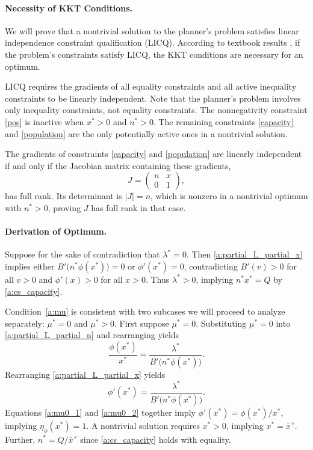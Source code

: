 \documentclass[12pt]{article}
\newcommand{\efficacy}{\phi}
\newcommand{\benefit}{B}
\newcommand{\xunitbar}{\bar{x}^{\,e}}
\newcommand{\elasticity}[1]{\eta_{#1}}
\begin{document}
\paragraph{Necessity of KKT Conditions.}

We will prove that a nontrivial solution to the planner's problem
satisfies linear independence constraint qualification (LICQ).
According to textbook results \citep[see, e.g.,][]{Solodov2011}, if
the problem's constraints satisfy LICQ, the KKT conditions are
necessary for an optimum.

LICQ requires the gradients of all equality constraints and all active
inequality constraints to be linearly independent. Note that the
planner's problem involves only inequality constraints, not equality
constraints. The nonnegativity constraint \eqref{pos} is inactive when
$x^* > 0$ and $n^* > 0$. The remaining constraints \eqref{capacity}
and \eqref{population} are the only potentially active ones in a
nontrivial solution.

The gradients of constraints \eqref{capacity} and \eqref{population}
are linearly independent if and only if the Jacobian matrix containing
these gradients,
\begin{equation}
\label{a:Jacobian}
J = \begin{pmatrix}
n & x \\
0 & 1
\end{pmatrix},
\end{equation}
has full rank. Its determinant is $|J| = n$, which is nonzero in a
nontrivial optimum with $n^* > 0$, proving $J$ has full rank in that
case.

\paragraph{Derivation of Optimum.}

Suppose for the sake of contradiction that $\lambda^* = 0$. Then
\eqref{a:partial_L_partial_x} implies either $\benefit' \! \bigl( n^*
\efficacy(x^*) \bigr) = 0$ or $\efficacy'(x^*) = 0$, contradicting
$\benefit'(v) > 0$ for all $v > 0$ and $\efficacy'(x) > 0$ for all $x
> 0$. Thus $\lambda^* > 0$, implying $n^* x^* = Q$ by
\eqref{a:cs_capacity}.

Condition~\ref{a:mu} is consistent with two subcases we will proceed
to analyze separately: $\mu^* = 0$ and $\mu^* > 0$. First suppose
$\mu^* = 0$. Substituting $\mu^* = 0$ into
\eqref{a:partial_L_partial_n} and rearranging yields
\begin{equation}
\label{a:mu0_1}
\frac{\efficacy(x^*)}{x^*} =
\frac{\lambda^*}{\benefit'\!\bigl( n^*\efficacy(x^*) \bigr)}.
\end{equation}
Rearranging \eqref{a:partial_L_partial_x} yields 
\begin{equation}
\label{a:mu0_2}
\efficacy'(x^*) = \frac{\lambda^*}{\benefit'\!\bigl( n^*\efficacy(x^*)
  \bigr)}.
\end{equation}
Equations \eqref{a:mu0_1} and \eqref{a:mu0_2} together imply
$\efficacy'(x^*) = \efficacy(x^*) / x^*$, implying
$\elasticity{\efficacy}(x^*) = 1$. A nontrivial solution requires $x^*
> 0$, implying $x^* = \xunitbar$. Further, $n^* = Q/\xunitbar$ since
\eqref{a:cs_capacity} holds with equality.
\end{document}
